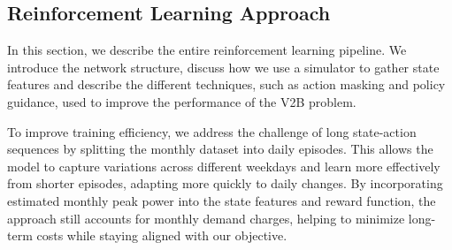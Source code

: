 


 

% 
% 

\subsection{Reinforcement Learning Approach}
\label{sec:RL}
In this section, we describe the entire reinforcement learning pipeline. We introduce the network structure, discuss how we use a simulator to gather state features and describe the different techniques, such as action masking and policy guidance, used to improve the performance of the V2B problem.  

To improve training efficiency, we address the challenge of long state-action sequences by splitting the monthly dataset into daily episodes. This allows the model to capture variations across different weekdays and learn more effectively from shorter episodes, adapting more quickly to daily changes. By incorporating estimated monthly peak power into the state features and reward function, the approach still accounts for monthly demand charges, helping to minimize long-term costs while staying aligned with our objective. 

